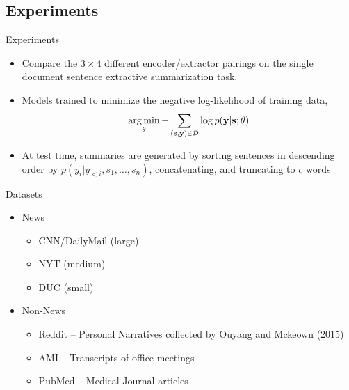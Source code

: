 \subsection{Experiments}

\begin{frame}{Experiments}

\begin{itemize}
\item Compare the $3 \times 4$ different encoder/extractor pairings on the single
document sentence extractive summarization task.
\vspace{20pt}

\item Models trained to minimize the negative log-likelihood of training data,
\[\operatorname*{arg\,min}_{\theta} -\sum_{(\mathbf{s}, \mathbf{y}) \in \mathcal{D}} \log p(\mathbf{y}|\mathbf{s};\theta)\]

\item At test time, summaries are generated by sorting sentences in descending order by
    $p(y_i|y_{<i},s_1,\ldots,s_n)$, concatenating, and truncating to $c$ words
\end{itemize}
\end{frame}

\begin{frame}{Datasets}
    \begin{itemize}
        \item News
            \begin{itemize}
                \item CNN/DailyMail (large)
                \item NYT (medium)
                \item DUC (small)
            \end{itemize}
            \vspace{10pt}
        \item Non-News
            \begin{itemize}
                \item Reddit -- Personal Narratives collected by Ouyang and Mckeown (2015) 
                \item AMI  -- Transcripts of office meetings
                \item PubMed -- Medical Journal articles
            \end{itemize}
    \end{itemize}

\end{frame}



